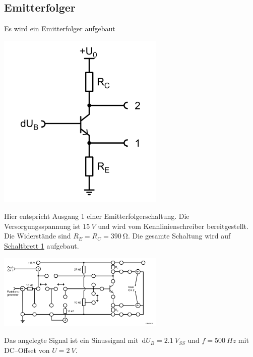 \documentclass[10pt]{article}
\newcommand{\td}{\,\text{d}}
\newenvironment{Figure}
  {\par\medskip\noindent\minipage{\linewidth}}
  {\endminipage\par\medskip}
\begin{document}
\begin{multicols}{2}
        \newpage
        \subsection{Emitterfolger}
        Es wird ein Emitterfolger aufgebaut
        \begin{Figure}
                \centering
                \includegraphics[width=0.6\textwidth]{emitterfolger.png}
        \end{Figure}
        Hier entspricht Ausgang 1 einer Emitterfolgerschaltung.
        Die Versorgungsspannung ist $\SI{15}{V}$ und wird vom Kennlinienschreiber bereitgestellt.
        Die Widerstände sind $R_E=R_C=\SI{390}{\ohm}$.
        Die gesamte Schaltung wird auf \hyperref[fig:schaltbrett_1]{Schaltbrett 1} aufgebaut.
        \begin{Figure}
                \centering
                \includegraphics[width=0.6\textwidth]{schaltbrett_1.png}
                 \label{fig:schaltbrett_1}
        \end{Figure}
        Das angelegte Signal ist ein Sinussignal mit $\td U_B=\SI{2.1}{V_{SS}}$ und $f=\SI{500}{Hz}$ mit DC--Offset von $U=\SI{2}{V}$.
        \begin{Figure}

\end{Figure}
\end{multicols}
\end{document}
